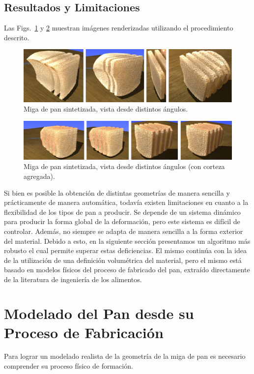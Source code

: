 \subsection{Resultados y Limitaciones}
Las Figs.~\ref{fg:crumb} y \ref{fg:results2} muestran imágenes renderizadas utilizando el procedimiento descrito.

\begin{figure}
  \centerline{\includegraphics[width=13cm]{figures/crumb}}
  \caption{Miga de pan sintetizada, vista desde distintos ángulos.}
  \label{fg:crumb}
\end{figure}


\begin{figure}
  \centerline{\includegraphics[width=13cm]{figures/results2}}
  \caption{Miga de pan sintetizada, vista desde distintos ángulos (con corteza agregada).}
  \label{fg:results2}
\end{figure}

Si bien es posible la obtención de distintas geometrías de manera sencilla y prácticamente de manera automática, todavía existen limitaciones en cuanto a la flexibilidad de los tipos de pan a producir.
Se depende de un sistema dinámico para producir la forma global de la deformación, pero este sistema es difícil de controlar.
Además, no siempre se adapta de manera sencilla a la forma exterior del material.
Debido a esto, en la siguiente sección presentamos un algoritmo más robusto el cual permite superar estas deficiencias.
El mismo continúa con la idea de la utilización de una definición volumétrica del material, pero el mismo está basado en modelos físicos del proceso de fabricado del pan, extraído directamente de la literatura de ingeniería de los alimentos.

\section{Modelado del Pan desde su Proceso de Fabricación}
Para lograr un modelado realista de la geometría de la miga de pan es necesario comprender su proceso físico de formación.

